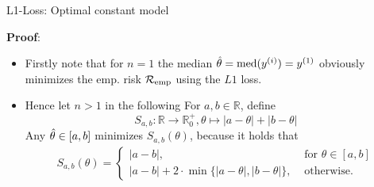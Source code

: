 \documentclass[11pt,compress,t,notes=noshow, xcolor=table]{beamer}
\begin{document}
\begin{frame}{L1-Loss: Optimal constant model}


\textbf{Proof}: 

\begin{itemize}
  \item Firstly note that for $n = 1$ the median $\hat{\theta} = \text{med}(y^{(i)}) = y^{(1)}$ obviously minimizes the emp. risk $\mathcal{R}_{\text{emp}}$ using the $L1$ loss. 

  \item Hence let $n > 1$ in the following For $a,b \in \mathbb{R}$, define 
  $$S_{a,b}:\mathbb{R} \rightarrow \mathbb{R}^+_0, \theta \mapsto |a- \theta| + |b-\theta|$$
  \vspace*{-0.3cm}
  Any $\hat{\theta} \in [a,b]$ minimizes $S_{a,b}(\theta)$, because it holds that
  \vspace*{-0.0cm}
  \begin{align*}
  S_{a,b}(\theta) = \begin{cases}|a-b| ,& \text{ for } \theta \in [a,b]\\ |a-b| + 2\cdot\min\{|a-\theta|,|b-\theta|\}
  ,& \text{ otherwise. }\end{cases}
  \end{align*}


\end{itemize}

\end{frame}
\end{document}
